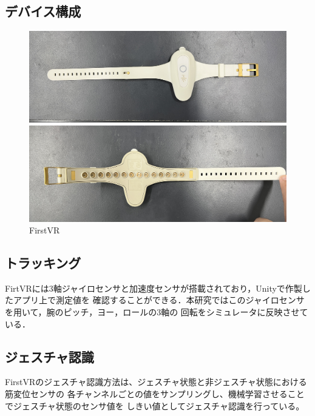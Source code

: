\documentclass{ltjsreport}
\begin{document}
		\subsection{デバイス構成}
				\begin{figure}[H]
				\centering
				\begin{minipage}{0.75\columnwidth}
				\centering
				\includegraphics[width = \columnwidth]{../figs/IMG_5130.JPG}
				\end{minipage}
				\hspace{0.04\columnwidth}
				\begin{minipage}{0.75\columnwidth}
				\centering
				\includegraphics[width = \columnwidth]{../figs/IMG_5131.JPG}
				\end{minipage}
				\caption{FirstVR}
				\end{figure}
		\subsection{トラッキング}
			FirtVRには3軸ジャイロセンサと加速度センサが搭載されており，Unityで作製したアプリ上で測定値を
			確認することができる．本研究ではこのジャイロセンサを用いて，腕のピッチ，ヨー，ロールの3軸の
			回転をシミュレータに反映させている．
		\subsection{ジェスチャ認識}
			FirstVRのジェスチャ認識方法は、ジェスチャ状態と非ジェスチャ状態における筋変位センサの
			各チャンネルごとの値をサンプリングし、機械学習させることでジェスチャ状態のセンサ値を
			しきい値としてジェスチャ認識を行っている。
\end{document}
